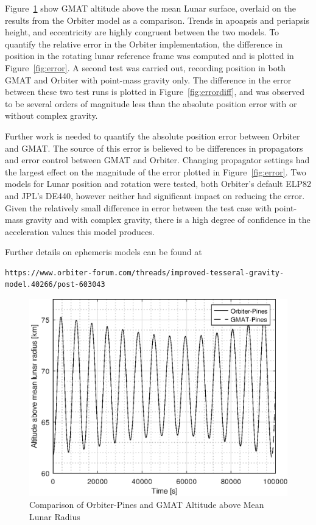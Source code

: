 \documentclass[a4paper]{article}
\begin{document}
Figure~\ref{fig:alt} show GMAT altitude above the mean Lunar surface, overlaid on the results from the Orbiter model as a comparison. Trends in apoapsis and periapsis height, and eccentricity are highly congruent between the two models. To quantify the relative error in the Orbiter implementation, the difference in position in the rotating lunar reference frame was computed and is plotted in Figure~\ref{fig:error}. A second test was carried out, recording position in both GMAT and Orbiter with point-mass gravity only. The difference in the error between these two test runs is plotted in Figure~\ref{fig:errordiff}, and was observed to be several orders of magnitude less than the absolute position error with or without complex gravity.

Further work is needed to quantify the absolute position error between Orbiter and GMAT. The source of this error is believed to be differences in propagators and error control between GMAT and Orbiter. Changing propagator settings had the largest effect on the magnitude of the error plotted in Figure~\ref{fig:error}. Two models for Lunar position and rotation were tested, both Orbiter's default ELP82 and JPL's DE440, however neither had significant impact on reducing the error. Given the relatively small difference in error between the test case with point-mass gravity and with complex gravity, there is a high degree of confidence in the acceleration values this model produces.

Further details on ephemeris models can be found at \begin{tiny}\begin{verbatim}https://www.orbiter-forum.com/threads/improved-tesseral-gravity-model.40266/post-603043\end{verbatim}\end{tiny}

\begin{figure}[h]
\centering
\includegraphics[width=1.0\textwidth]{altitude.eps}
\caption{Comparison of Orbiter-Pines and GMAT Altitude above Mean Lunar Radius}
\label{fig:alt}
\end{figure}
\end{document}

